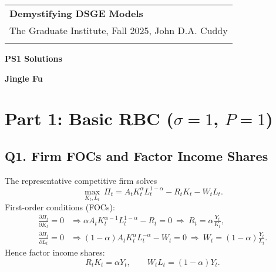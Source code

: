 \documentclass[a4paper,12pt]{article} %
\theoremstyle{nonitalic}
\newenvironment{solution}[1]
  {\renewcommand\theinnercustomsol{#1}\innercustomsol}
  {\endinnercustomsol}
\newcounter{solutionctr}
\renewcommand{\thesolutionctr}{(\alph{solutionctr})}
\newenvironment{autosolution}
  {\stepcounter{solutionctr}\begin{solution}{\thesolutionctr}}
  {\end{solution}}
\begin{document}
\thispagestyle{empty} %

\begin{tabular}{p{15.5cm}} %
{\large \bf Demystifying DSGE Models} \\
The Graduate Institute, Fall 2025, John D.A. Cuddy\\
\hline %
\\
\end{tabular} %

\vspace*{0.3cm} %

\begin{center} %
	{\Large \bf PS1 Solutions} %
	\vspace{2mm}
	
	{\bf Jingle Fu} %
		
\end{center}  

\vspace{0.4cm}



\section{Part 1: Basic RBC ($\sigma=1$, $P=1$)}

\subsection{Q1. Firm FOCs and Factor Income Shares}
The representative competitive firm solves
\begin{equation}
\max_{K_t,L_t}\ \Pi_t = A_t K_t^{\alpha} L_t^{1-\alpha} - R_t K_t - W_t L_t.
\end{equation}
First-order conditions (FOCs):
\begin{align}
\frac{\partial \Pi_t}{\partial K_t}=0 
&\Rightarrow \alpha A_t K_t^{\alpha-1} L_t^{1-\alpha} - R_t = 0 
\ \Rightarrow\ R_t=\alpha \frac{Y_t}{K_t},\\[4pt]
\frac{\partial \Pi_t}{\partial L_t}=0 
&\Rightarrow (1-\alpha) A_t K_t^{\alpha} L_t^{-\alpha} - W_t = 0 
\ \Rightarrow\ W_t=(1-\alpha)\frac{Y_t}{L_t}.
\end{align}
Hence factor income shares:
\begin{equation}
R_t K_t=\alpha Y_t, \qquad W_t L_t=(1-\alpha)Y_t.
\end{equation}
\end{document}
